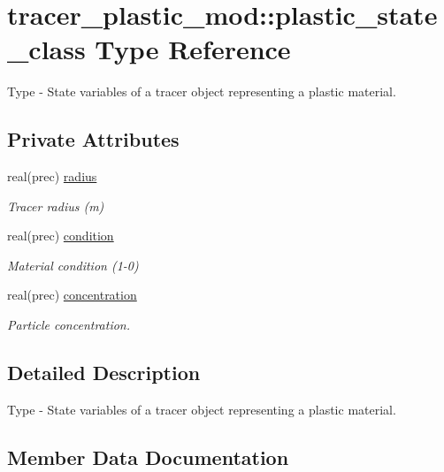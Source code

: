 \hypertarget{structtracer__plastic__mod_1_1plastic__state__class}{}\section{tracer\+\_\+plastic\+\_\+mod\+:\+:plastic\+\_\+state\+\_\+class Type Reference}
\label{structtracer__plastic__mod_1_1plastic__state__class}


Type -\/ State variables of a tracer object representing a plastic material.  


\subsection*{Private Attributes}
\begin{DoxyCompactItemize}
\item 
real(prec) \hyperlink{structtracer__plastic__mod_1_1plastic__state__class_a597b5dbe3ba58a0d58d7897fbadaea34}{radius}
\begin{DoxyCompactList}\small\item\em Tracer radius (m) \end{DoxyCompactList}\item 
real(prec) \hyperlink{structtracer__plastic__mod_1_1plastic__state__class_afd1aa02ed79b13a44724f5bd550debb7}{condition}
\begin{DoxyCompactList}\small\item\em Material condition (1-\/0) \end{DoxyCompactList}\item 
real(prec) \hyperlink{structtracer__plastic__mod_1_1plastic__state__class_a5eb0b91416c97191e62c5710beba6f8d}{concentration}
\begin{DoxyCompactList}\small\item\em Particle concentration. \end{DoxyCompactList}\end{DoxyCompactItemize}


\subsection{Detailed Description}
Type -\/ State variables of a tracer object representing a plastic material. 

\subsection{Member Data Documentation}
\mbox{\label{structtracer__plastic__mod_1_1plastic__state__class_a5eb0b91416c97191e62c5710beba6f8d}} 

